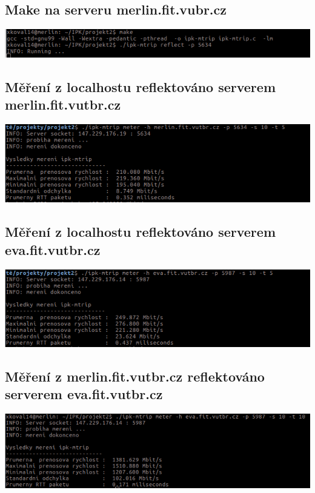 \documentclass[11pt]{article}
\begin{document}
		\subsection{Make na serveru merlin.fit.vubr.cz}
	\begin{center}
		\includegraphics[scale = 0.8]{img/makeMerlin.png}\\
	\end{center}

	\subsection{Měření z localhostu reflektováno serverem merlin.fit.vutbr.cz}
	\begin{center}
		\includegraphics[scale = 0.83]{img/mereniMerlin.png}\\
	\end{center}
	
	\subsection{Měření z localhostu reflektováno serverem eva.fit.vutbr.cz}
	\begin{center}
		\includegraphics[scale = 0.83]{img/mereniEva.png}\\
	\end{center}
	\newpage
	\subsection{Měření z merlin.fit.vutbr.cz reflektováno serverem eva.fit.vutbr.cz}
	\begin{center}
		\includegraphics[scale = 0.76]{img/mereniMerlinEva.png}\\
	\end{center}
\end{document}
